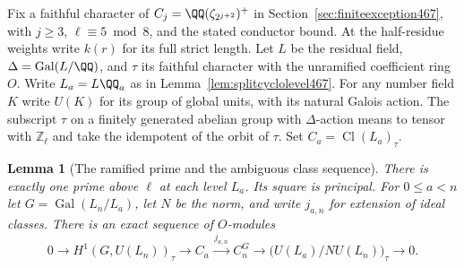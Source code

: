 \documentclass[a4paper,11pt]{article}
\newtheorem{lemma}[proposition]{Lemma}
\theoremstyle{definition}
\theoremstyle{remark}
\newcommand{\ZZ}{\mathbb Z}\newcommand{\ord}{\operatorname{ord}}
\numberwithin{equation}{section}
\newcommand{\Cl}{\operatorname{Cl}}
\begin{document}
Fix a faithful character of \(C_j=\QQ(\zeta_{2^{j+2}})^+\) in
Section~\ref{sec:finiteexception467}, with \(j\ge3\),
\(\ell\equiv5\bmod8\), and the stated conductor bound. At the
half-residue weights write \(k(r)\) for its full strict length.
Let \(L\) be the residual field, \(\Delta=\operatorname{Gal}(L/\QQ)\),
and \(\tau\) its faithful character with the unramified coefficient
ring \(O\). Write \(L_a=L\QQ_a\) as in
Lemma~\ref{lem:splitcyclolevel467}. For any number field \(K\)
write \(U(K)\) for its group of global units, with its natural
Galois action. The subscript \(\tau\) on a finitely generated
abelian group with \(\Delta\)-action means to tensor with
\(\ZZ_\ell\) and take the idempotent of the orbit of \(\tau\).
Set \(C_a=\Cl(L_a)_\tau\).

\begin{lemma}[The ramified prime and the ambiguous class sequence]\leavevmode
\label{lem:ambiguous505}
There is exactly one prime above \(\ell\) at each level \(L_a\).
Its square is principal. For \(0\le a<n\) let
\(G=\operatorname{Gal}(L_n/L_a)\), let \(N\) be the norm, and
write \(j_{a,n}\) for extension of ideal classes. There is an
exact sequence of \(O\)-modules
\[
 0\longrightarrow H^1(G,U(L_n))_\tau
  \longrightarrow C_a \xrightarrow{\,j_{a,n}\,} C_n^G
  \longrightarrow \bigl(U(L_a)/N U(L_n)\bigr)_\tau
  \longrightarrow 0 .
\]
\end{lemma}
\end{document}
